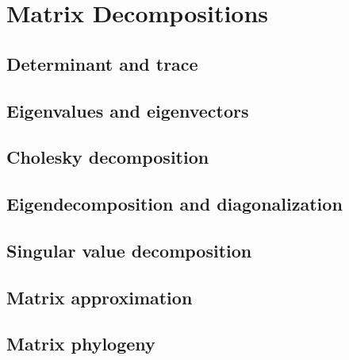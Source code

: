 \section{Matrix Decompositions}

\subsection{Determinant and trace}
\subsection{Eigenvalues and eigenvectors}
\subsection{Cholesky decomposition}
\subsection{Eigendecomposition and diagonalization}
\subsection{Singular value decomposition}
\subsection{Matrix approximation}
\subsection{Matrix phylogeny}
